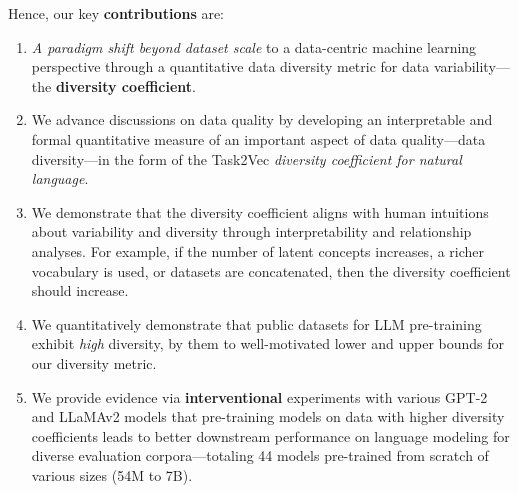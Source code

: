 \documentclass[10pt]{article} %
\begin{document}
Hence, our key \textbf{contributions} are:
\begin{enumerate}
    \item \textit{A paradigm shift beyond dataset scale} to a data-centric machine learning perspective through a quantitative data diversity metric for data variability---the \textbf{diversity coefficient}.
    \item We advance discussions on data quality by developing an interpretable and formal quantitative measure of an important aspect of data quality---data diversity---in the form of the Task2Vec \textit{diversity coefficient for natural language}.
    \item We demonstrate that the diversity coefficient aligns with human intuitions about variability and diversity through interpretability and relationship analyses.
    For example, if 
    the number of latent concepts increases, a richer vocabulary is used, or datasets are concatenated, then the diversity coefficient should increase.
    \item We quantitatively demonstrate that public datasets for LLM pre-training exhibit \textit{high} diversity, by them to well-motivated lower and upper bounds for our diversity metric.
    \item We provide evidence via \textbf{interventional} experiments with various GPT-2 and LLaMAv2 models that pre-training models on data with higher diversity coefficients leads to better downstream performance on language modeling for diverse evaluation corpora---totaling 44 models pre-trained from scratch of various sizes (54M  to 7B).
\end{enumerate}
\end{document}
